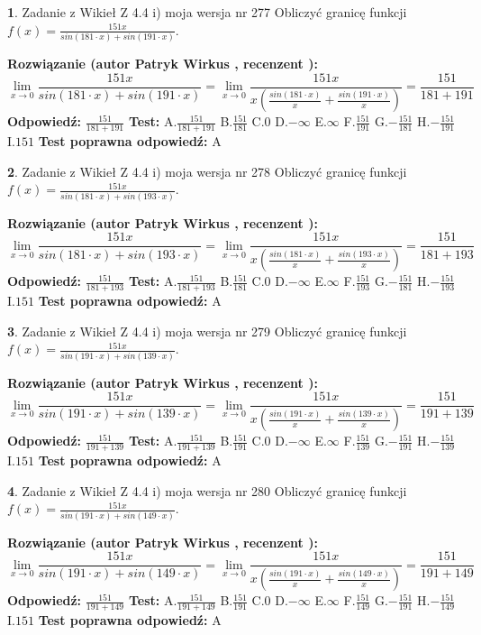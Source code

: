 \documentclass[12pt, a4paper]{article}
\theoremstyle{definition} %
\newtheorem{zad}{}
\newcommand{\zadStart}[1]{\begin{zad}#1\newline}
\newcommand{\zadStop}{\end{zad}}
\newcommand{\rozwStart}[2]{\noindent \textbf{Rozwiązanie (autor #1 , recenzent #2): }\newline}
\newcommand{\rozwStop}{\newline}
\newcommand{\odpStart}{\noindent \textbf{Odpowiedź:}\newline}
\newcommand{\odpStop}{\newline}
\newcommand{\testStart}{\noindent \textbf{Test:}\newline}
\newcommand{\testStop}{\newline}
\newcommand{\kluczStart}{\noindent \textbf{Test poprawna odpowiedź:}\newline}
\newcommand{\kluczStop}{\newline}
\begin{document}
\zadStart{Zadanie z Wikieł Z 4.4 i) moja wersja nr 277}
Obliczyć granicę funkcji $f(x)=\frac{151x}{sin(181\cdot x) +sin(191\cdot x)}$.
\zadStop
\rozwStart{Patryk Wirkus}{}
$$\lim\limits_{x\to 0}\frac{151x}{sin(181\cdot x) +sin(191\cdot x)}=\lim\limits_{x\to 0}\frac{151x}{x(\frac{sin(181\cdot x)}{x}+\frac{sin(191\cdot x)}{x})}=\frac{151}{181+191}$$
\rozwStop
\odpStart
$\frac{151}{181+191}$
\odpStop
\testStart
A.$\frac{151}{181+191}$
B.$\frac{151}{181}$
C.$0$
D.$-\infty$
E.$\infty$
F.$\frac{151}{191}$
G.$-\frac{151}{181}$
H.$-\frac{151}{191}$
I.$151$
\testStop
\kluczStart
A
\kluczStop



\zadStart{Zadanie z Wikieł Z 4.4 i) moja wersja nr 278}
Obliczyć granicę funkcji $f(x)=\frac{151x}{sin(181\cdot x) +sin(193\cdot x)}$.
\zadStop
\rozwStart{Patryk Wirkus}{}
$$\lim\limits_{x\to 0}\frac{151x}{sin(181\cdot x) +sin(193\cdot x)}=\lim\limits_{x\to 0}\frac{151x}{x(\frac{sin(181\cdot x)}{x}+\frac{sin(193\cdot x)}{x})}=\frac{151}{181+193}$$
\rozwStop
\odpStart
$\frac{151}{181+193}$
\odpStop
\testStart
A.$\frac{151}{181+193}$
B.$\frac{151}{181}$
C.$0$
D.$-\infty$
E.$\infty$
F.$\frac{151}{193}$
G.$-\frac{151}{181}$
H.$-\frac{151}{193}$
I.$151$
\testStop
\kluczStart
A
\kluczStop



\zadStart{Zadanie z Wikieł Z 4.4 i) moja wersja nr 279}
Obliczyć granicę funkcji $f(x)=\frac{151x}{sin(191\cdot x) +sin(139\cdot x)}$.
\zadStop
\rozwStart{Patryk Wirkus}{}
$$\lim\limits_{x\to 0}\frac{151x}{sin(191\cdot x) +sin(139\cdot x)}=\lim\limits_{x\to 0}\frac{151x}{x(\frac{sin(191\cdot x)}{x}+\frac{sin(139\cdot x)}{x})}=\frac{151}{191+139}$$
\rozwStop
\odpStart
$\frac{151}{191+139}$
\odpStop
\testStart
A.$\frac{151}{191+139}$
B.$\frac{151}{191}$
C.$0$
D.$-\infty$
E.$\infty$
F.$\frac{151}{139}$
G.$-\frac{151}{191}$
H.$-\frac{151}{139}$
I.$151$
\testStop
\kluczStart
A
\kluczStop



\zadStart{Zadanie z Wikieł Z 4.4 i) moja wersja nr 280}
Obliczyć granicę funkcji $f(x)=\frac{151x}{sin(191\cdot x) +sin(149\cdot x)}$.
\zadStop
\rozwStart{Patryk Wirkus}{}
$$\lim\limits_{x\to 0}\frac{151x}{sin(191\cdot x) +sin(149\cdot x)}=\lim\limits_{x\to 0}\frac{151x}{x(\frac{sin(191\cdot x)}{x}+\frac{sin(149\cdot x)}{x})}=\frac{151}{191+149}$$
\rozwStop
\odpStart
$\frac{151}{191+149}$
\odpStop
\testStart
A.$\frac{151}{191+149}$
B.$\frac{151}{191}$
C.$0$
D.$-\infty$
E.$\infty$
F.$\frac{151}{149}$
G.$-\frac{151}{191}$
H.$-\frac{151}{149}$
I.$151$
\testStop
\kluczStart
A
\kluczStop
\end{document}
